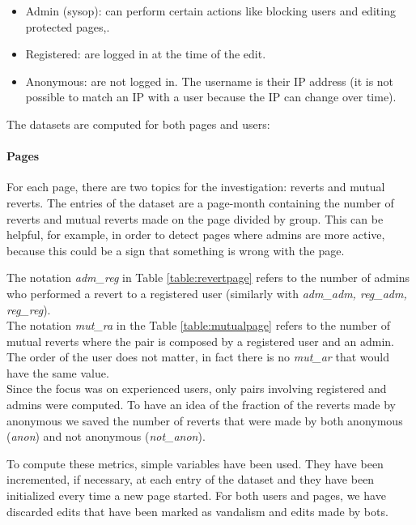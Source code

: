 \begin{itemize}
    \item Admin (sysop): can perform certain actions like blocking users and editing protected pages,.
    \item Registered: are logged in at the time of the edit.
    \item Anonymous: are not logged in. The username is their IP address (it is not possible to match an IP with a user
        because the IP can change over time).
\end{itemize}

The datasets are computed for both pages and users: 
\paragraph*{Pages} 
For each page, there are two topics for the investigation: reverts and mutual reverts. The entries of the
dataset are a page-month containing the number of reverts and mutual reverts made on the page
divided by group. This can be helpful, for example, in order to detect pages where admins are more active, because
this could be a sign that something is wrong with the page.



The notation \textit{adm\_reg} in Table \ref{table:revertpage} refers to the number of admins who performed a
revert to a registered user (similarly with \textit{adm\_adm, reg\_adm, reg\_reg}).\\

The notation \textit{mut\_ra} in the Table \ref{table:mutualpage} refers to the number of mutual
reverts where the pair is composed by a registered user and an admin. The order of the user does not
matter, in fact there is no \textit{mut\_ar} that would have the same value.\\


Since the focus was on experienced users, only pairs involving registered and admins were computed.
To have an idea of the fraction of the reverts made by anonymous we saved the number of reverts
that were made by both anonymous (\textit{anon}) and not anonymous (\textit{not\_anon}).

To compute these metrics, simple variables have been used. They have been incremented, if
necessary, at each entry of the dataset and they have been initialized every time a new page 
started. For both users and pages, we have discarded edits that have been marked as vandalism and
edits made by bots.

